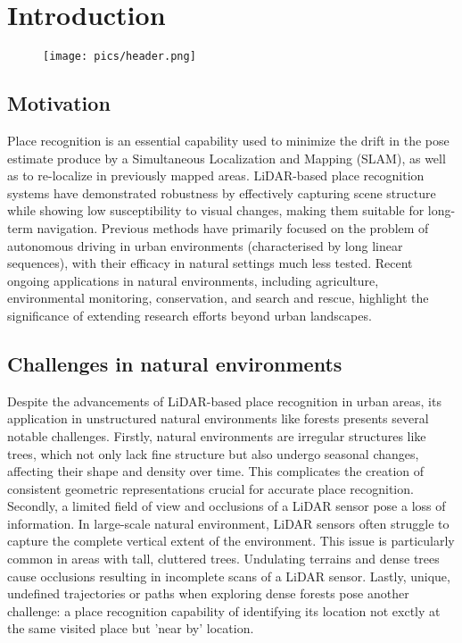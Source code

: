 \chapter{Introduction}
\label{chap:intro}

\begin{figure}
    \texttt{[image: pics/header.png]}
    \label{fig:motivation}
\end{figure}

\section{Motivation}
Place recognition is an essential capability used to minimize the drift in the pose estimate produce by a Simultaneous Localization and Mapping (SLAM), as well as to re-localize in previously mapped areas. 
LiDAR-based place recognition systems have demonstrated robustness by effectively capturing scene structure while showing low susceptibility to visual changes, making them suitable for long-term navigation. 
Previous methods have primarily focused on the problem of autonomous driving in urban environments (characterised by long linear sequences), with their efficacy in natural settings much less tested.
Recent ongoing applications in natural environments, including agriculture, environmental monitoring, conservation, and search and rescue, highlight the significance of extending research efforts beyond urban landscapes.

\section{Challenges in natural environments}
Despite the advancements of LiDAR-based place recognition in urban areas, its application in unstructured natural environments like forests presents several notable challenges. 
Firstly, natural environments are irregular structures like trees, which not only lack fine structure but also undergo seasonal changes, affecting their shape and density over time. This complicates the creation of consistent geometric representations crucial for accurate place recognition.
Secondly, a limited field of view and occlusions of a LiDAR sensor pose a loss of information. In large-scale natural environment, LiDAR sensors often struggle to capture the complete vertical extent of the environment. 
This issue is particularly common in areas with tall, cluttered trees.  Undulating terrains and dense trees cause occlusions resulting in incomplete scans of a LiDAR sensor. 
Lastly, unique, undefined trajectories or paths when exploring dense forests pose another challenge: a place recognition capability of identifying its location not exctly at the same visited place but 'near by' location. 


